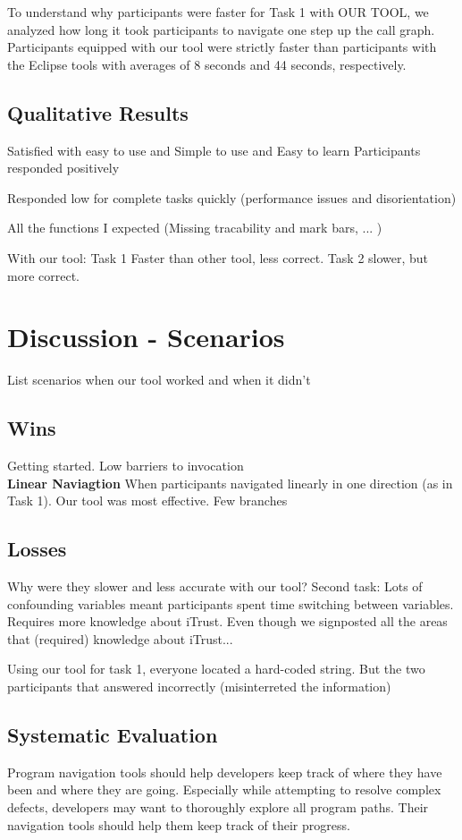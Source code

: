 \documentclass[conference]{IEEEtran}
\newcommand{\toolName}{OUR TOOL}
\begin{document}
To understand why participants were faster for Task 1 with \toolName, we analyzed how long it took participants to navigate one step up the call graph. Participants equipped with our tool were strictly faster than participants with the Eclipse tools with averages of 8 seconds and 44 seconds, respectively. 


\subsection{Qualitative Results} 
Satisfied with easy to use	and Simple to use and Easy to learn Participants responded positively

Responded low for complete tasks quickly (performance issues and disorientation)

All the functions I expected (Missing tracability and mark bars, ... )

With our tool: Task 1 Faster than other tool, less correct. Task 2 slower, but more correct. 


\section{Discussion - Scenarios}
List scenarios when our tool worked and when it didn't
\subsection{Wins}
Getting started. Low barriers to invocation
\\
\textbf{Linear Naviagtion}
When participants navigated linearly in one direction (as in Task 1). Our tool was most effective. 
Few branches



\subsection{Losses}
Why were they slower and less accurate with our tool?
Second task: 
Lots of confounding variables meant participants spent time switching between variables.
Requires more knowledge about iTrust. Even though we signposted all the areas that (required) knowledge about iTrust...

Using our tool for task 1, everyone located a hard-coded string. But the two participants that answered incorrectly (misinterreted the information)

\subsection{Systematic Evaluation}
Program navigation tools should help developers keep track of where they have been and where they are going. Especially while attempting to resolve complex defects, developers may want to thoroughly explore all program paths. Their navigation tools should help them keep track of their progress.
\end{document}
